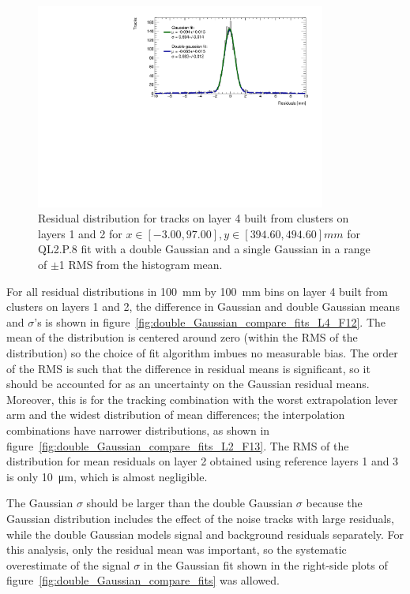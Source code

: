 \begin{figure}
    \centering
    \includegraphics[width = 0.85\textwidth]{figures/figure_double_gaus_vs_gaus_example_fit_QL2P08_3100V_2021-06-18_and_2021-07-19_xbin_10_ybin_5_layer4_fixedlayers12.pdf}
    \caption{Residual distribution for tracks on layer 4 built from clusters on layers 1 and 2 for $x\in\left[-3.00, 97.00\right],  y\in\left[394.60, 494.60\right] mm$ for QL2.P.8 fit with a double Gaussian and a single Gaussian in a range of $\pm$1 RMS from the histogram mean.}
    \label{fig:double_Gaussian_example_fit}
\end{figure}

For all residual distributions in \SI{100}{\milli\meter} by \SI{100}{\milli\meter} bins on layer 4 built from clusters on layers 1 and 2, the difference in Gaussian and double Gaussian means and $\sigma$'s is shown in figure~\ref{fig:double_Gaussian_compare_fits_L4_F12}. The mean of the distribution is centered around zero (within the RMS of the distribution) so the choice of fit algorithm imbues no measurable bias. The order of the RMS is such that the difference in residual means is significant, so it should be accounted for as an uncertainty on the Gaussian residual means. Moreover, this is for the tracking combination with the worst extrapolation lever arm and the widest distribution of mean differences; the interpolation combinations have narrower distributions, as shown in figure~\ref{fig:double_Gaussian_compare_fits_L2_F13}. The RMS of the distribution for mean residuals on layer 2 obtained using reference layers 1 and 3 is only \SI{10}{\micro\meter}, which is almost negligible.

The Gaussian $\sigma$ should be larger than the double Gaussian $\sigma$ because the Gaussian distribution includes the effect of the noise tracks with large residuals, while the double Gaussian models signal and background residuals separately. For this analysis, only the residual mean was important, so the systematic overestimate of the signal $\sigma$ in the Gaussian fit shown in the right-side plots of figure~\ref{fig:double_Gaussian_compare_fits} was allowed.


